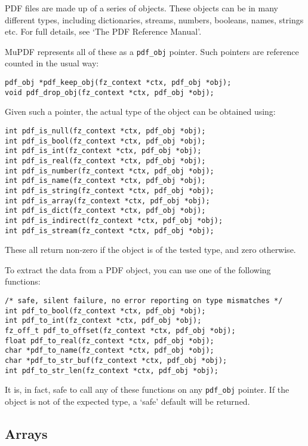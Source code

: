 \documentclass[oneside]{book}
\begin{document}
PDF files are made up of a series of objects. These objects can be in many different types, including dictionaries, streams, numbers, booleans, names, strings etc. For full details, see `The PDF Reference Manual'.

MuPDF represents all of these as a \texttt{pdf\_obj} pointer. Such pointers are reference counted in the usual way:

\begin{lstlisting}
pdf_obj *pdf_keep_obj(fz_context *ctx, pdf_obj *obj);
void pdf_drop_obj(fz_context *ctx, pdf_obj *obj);
\end{lstlisting}

Given such a pointer, the actual type of the object can be obtained using:

\begin{lstlisting}
int pdf_is_null(fz_context *ctx, pdf_obj *obj);
int pdf_is_bool(fz_context *ctx, pdf_obj *obj);
int pdf_is_int(fz_context *ctx, pdf_obj *obj);
int pdf_is_real(fz_context *ctx, pdf_obj *obj);
int pdf_is_number(fz_context *ctx, pdf_obj *obj);
int pdf_is_name(fz_context *ctx, pdf_obj *obj);
int pdf_is_string(fz_context *ctx, pdf_obj *obj);
int pdf_is_array(fz_context *ctx, pdf_obj *obj);
int pdf_is_dict(fz_context *ctx, pdf_obj *obj);
int pdf_is_indirect(fz_context *ctx, pdf_obj *obj);
int pdf_is_stream(fz_context *ctx, pdf_obj *obj);
\end{lstlisting}

These all return non-zero if the object is of the tested type, and zero otherwise.

To extract the data from a PDF object, you can use one of the following functions:

\begin{lstlisting}
/* safe, silent failure, no error reporting on type mismatches */
int pdf_to_bool(fz_context *ctx, pdf_obj *obj);
int pdf_to_int(fz_context *ctx, pdf_obj *obj);
fz_off_t pdf_to_offset(fz_context *ctx, pdf_obj *obj);
float pdf_to_real(fz_context *ctx, pdf_obj *obj);
char *pdf_to_name(fz_context *ctx, pdf_obj *obj);
char *pdf_to_str_buf(fz_context *ctx, pdf_obj *obj);
int pdf_to_str_len(fz_context *ctx, pdf_obj *obj);
\end{lstlisting}

It is, in fact, safe to call any of these functions on any \texttt{pdf\_obj} pointer. If the object is not of the expected type, a `safe' default will be returned.

\subsection{Arrays}
\end{document}
